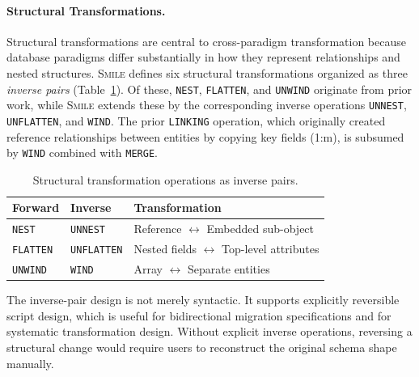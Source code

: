 \documentclass{llncs}
\begin{document}
\paragraph{Structural Transformations.}
Structural transformations are central to cross-paradigm transformation because database paradigms differ substantially in how they represent relationships and nested structures.
\textsc{Smile} defines six structural transformations organized as three \emph{inverse pairs} (Table~\ref{tab:structural-ops}).
Of these, \texttt{NEST}, \texttt{FLATTEN}, and \texttt{UNWIND} originate from prior work, while \textsc{Smile} extends these by the corresponding inverse operations \texttt{UNNEST}, \texttt{UNFLATTEN}, and \texttt{WIND}.
The prior \texttt{LINKING} operation, which originally created reference relationships between entities by copying key fields (1:m), is subsumed by \texttt{WIND} combined with \texttt{MERGE}.

\begin{table}[H]
\centering
\caption{Structural transformation operations as inverse pairs.}
\label{tab:structural-ops}
\small
\begin{tabular}{lll}
\toprule
\textbf{Forward} & \textbf{Inverse} & \textbf{Transformation} \\
\midrule
\texttt{NEST}    & \texttt{UNNEST}    & Reference $\leftrightarrow$ Embedded sub-object \\
\texttt{FLATTEN} & \texttt{UNFLATTEN} & Nested fields $\leftrightarrow$ Top-level attributes \\
\texttt{UNWIND}  & \texttt{WIND}      & Array $\leftrightarrow$ Separate entities \\
\bottomrule
\end{tabular}
\end{table}

The inverse-pair design is not merely syntactic.
It supports explicitly reversible script design, which is useful for bidirectional migration specifications and for systematic transformation design.
Without explicit inverse operations, reversing a structural change would require users to reconstruct the original schema shape manually.


\end{document}
